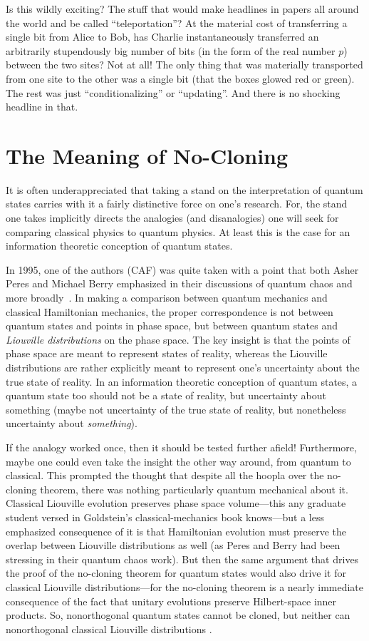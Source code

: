\documentclass[aps,pra,superscriptaddress,12pt,tightenlines,nofootinbib]{revtex4-2}
\begin{document}
Is this wildly exciting?  The stuff that would make headlines in
papers all around the world and be called ``teleportation''?  At the
material cost of transferring a single bit from Alice to Bob, has
Charlie instantaneously transferred an arbitrarily stupendously big
number of bits (in the form of the real number $p$) between the two
sites?  Not at all!  The only thing that was materially transported
from one site to the other was a single bit (that the boxes glowed red
or green).  The rest was just ``conditionalizing'' or ``updating''.
And there is no shocking headline in that.

\section{The Meaning of No-Cloning}

It is often underappreciated that taking a stand on the interpretation of quantum states carries with it a fairly distinctive force on one's research.  For, the stand one takes implicitly directs the analogies (and disanalogies) one will seek for comparing classical physics to quantum physics.  At least this is the case for an information theoretic conception of quantum states.

In 1995, one of the authors (CAF) was quite taken with a point that both Asher Peres and Michael Berry emphasized in their discussions of quantum chaos and more broadly~\cite{Peres95}.  In making a comparison between quantum mechanics and classical Hamiltonian mechanics, the proper correspondence is not between quantum states and points in phase space, but between quantum states and {\it Liouville distributions\/} on the phase space.  The key insight is that the points of phase space are meant to represent states of reality, whereas the Liouville distributions are rather explicitly meant to represent one's uncertainty about the true state of reality.  In an information theoretic conception of quantum states, a quantum state too should not be a state of reality, but uncertainty about something (maybe not uncertainty of the true state of reality, but nonetheless uncertainty about  {\it something\/}).

If the analogy worked once, then it should be tested further afield!  Furthermore, maybe one could even take the insight the other way around, from quantum to classical.  This prompted the thought that despite all the hoopla over the no-cloning theorem,  there was nothing particularly quantum mechanical about it.  Classical Liouville evolution preserves phase space volume---this any graduate student versed in Goldstein's classical-mechanics book \cite{Goldstein65} knows---but a less emphasized consequence of it is that Hamiltonian evolution must preserve the overlap between Liouville distributions as well (as Peres and Berry had been stressing in their quantum chaos work).  But then the same argument that drives the proof of the no-cloning theorem for quantum states would also drive it for classical Liouville distributions---for the no-cloning theorem is a nearly immediate consequence of the fact that unitary evolutions preserve Hilbert-space inner products.  So, nonorthogonal quantum states cannot be cloned, but neither can nonorthogonal classical Liouville distributions \cite{Caves96}.
\end{document}
